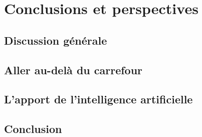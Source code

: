 \chapter{Conclusions et perspectives}

\todo{}

\section{Discussion générale}

\todo{}

\section{Aller au-delà du carrefour}

\todo{}

\section{L'apport de l'intelligence artificielle}

\todo{}

\section{Conclusion}

\todo{}